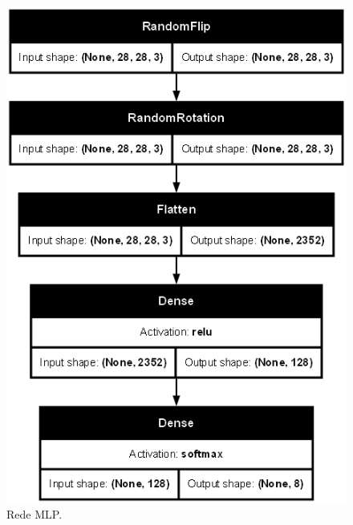 \documentclass[final,5p]{elsarticle}
\numberwithin{equation}{section}
\begin{document}
        \begin{figure}[H]
            \includegraphics[width=0.95\columnwidth]{MLP_model.png}
            \caption{Rede MLP.}\label{fig:ModeloMLP}
        \end{figure}
\end{document}
